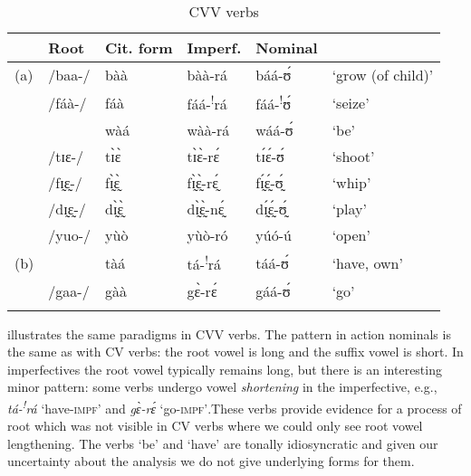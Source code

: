 \documentclass[output=paper,newtxmath,modfonts,nonflat,draftmode]{langsci/langscibook}
\begin{document}
\begin{table}
\begin{tabularx}{\textwidth}{lllllX}
\lsptoprule
& {Root} & {Cit. form} & {Imperf.} & {Nominal} & \\
\midrule
(a)	&/baa-/	&bàà	&bàà-rá	&báá-ʊ́	&‘grow (of child)’\\
	&/fáà-/ &    	fáà &	fáá-\textsuperscript{!}rá	& fáá-\textsuperscript{!}ʊ́	&‘seize’\\
	&	&	wàá	& wàà-rá	&wáá-ʊ́	& ‘be’\\
	&/tɪɛ-/&	tɪ̀ɛ̀	& tɪ̀ɛ̀-rɛ́	&tɪ́ɛ́-ʊ́	& ‘shoot’\\
	&/fɪ̰ɛ̰-/&	fɪ̰̀ɛ̰̀	& fɪ̰̀ɛ̰̀-rɛ̰́	&fɪ̰́ɛ̰́-ʊ̰́	& ‘whip’\\
	&/dɪ̰ɛ̰-/&	dɪ̰̀ɛ̰̀	& dɪ̰̀ɛ̰̀-nɛ̰́	&dɪ̰́ɛ̰́-ʊ̰́	& ‘play’\\
	&/yuo-/	&yùò	& yùò-ró	&yúó-ú	& ‘open’\\
\tablevspace
(b)	&&tàá	& tá-\textsuperscript{!}rá	& táá-ʊ́ & ‘have, own’\\
	&/gaa-/	&gàà	& gɛ̀-rɛ́	&gáá-ʊ́	& ‘go’\\
\lspbottomrule
\end{tabularx}
\caption{CVV verbs}
\label{tab:anttila:8}
\end{table}

  illustrates the same paradigms in CVV verbs. The pattern in action nominals is the same as with CV verbs: the root vowel is long and the suffix vowel is short. In imperfectives the root vowel typically remains long, but there is an interesting minor pattern: some verbs undergo vowel \textit{shortening} in the imperfective, e.g., \textit{tá-\textsuperscript{!}}\textit{rá} ‘have-\textsc{impf}’ and \textit{gɛ̀-rɛ́} ‘go-\textsc{impf’}.\footnotemark[ablaut] These verbs provide evidence for a process of root  which was not visible in CV verbs where we could only see root vowel lengthening. The verbs ‘be’ and ‘have’ are tonally idiosyncratic and given our uncertainty about the analysis we do not give underlying forms for them.

\end{document}
